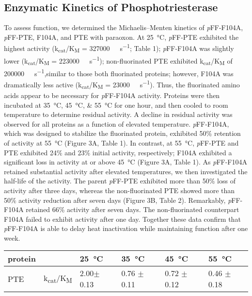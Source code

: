 \begin{refsection}
\subsection{Enzymatic Kinetics of Phosphotriesterase}

To assess function, we determined the Michaelis–Menten kinetics of
\emph{p}FF-F104A, \emph{p}FF-PTE, F104A, and PTE with paraoxon. At
\SI{25}{\celsius}, \emph{p}FF-PTE exhibited the highest activity
(k\textsubscript{cat}/K\textsubscript{M} = \SI{327000}{\per\Molar\per\second};
Table 1); \emph{p}FF-F104A was slightly lower
(k\textsubscript{cat}/K\textsubscript{M} = \SI{223000}{\per\Molar\per\second});
non-fluorinated PTE exhibited k\textsubscript{cat}/K\textsubscript{M} of
\SI{200000}{\per\Molar\per\second},similar to those both fluorinated proteins;
however, F104A was dramatically less active
(k\textsubscript{cat}/K\textsubscript{M} = \SI{23000}{\per\Molar\per\second}).
Thus, the fluorinated amino acids appear to be necessary for \emph{p}FF-F104A
activity.  Proteins were then incubated at \SIlist{35;45;55}{\celsius} for one
hour, and then cooled to room temperature to determine residual activity. A
decline in residual activity was observed for all proteins as a function of
elevated temperature. \emph{p}FF-F104A, which was designed to stabilize the
fluorinated protein, exhibited 50\% retention of activity at \SI{55}{\celsius}
(Figure 3A, Table 1). In contrast, at \SI{55}{\celsius}, \emph{p}FF-PTE and PTE
exhibited 24\% and 23\% initial activity, respectively; F104A exhibited a
significant loss in activity at or above \SI{45}{\celsius} (Figure 3A, Table
1). As \emph{p}FF-F104A retained substantial activity after elevated
temperatures, we then investigated the half-life of the activity. The parent
\emph{p}FF-PTE exhibited more than 50\% loss of activity after three days,
whereas the non-fluorinated PTE showed more than 50\% activity reduction after
seven days (Figure 3B, Table 2). Remarkably, \emph{p}FF-F104A retained 66\%
activity after seven days. The non-fluorinated counterpart F104A failed to
exhibit activity after one day. Together these data confirm that
\emph{p}FF-F104A is able to delay heat inactivation while maintaining function
after one week.
\begin{table}[h!]
\centering
    \begin{tabular}{llllll}
    \hline
    protein                 &  & \SI{25}{\celsius} & \SI{35}{\celsius} &
    \SI{45}{\celsius} & \SI{55}{\celsius} \\ 
    \hline
    \multirow{2}{*}{PTE}    & k\textsubscript{cat}/K\textsubscript{M} & 2.00$
    \pm$ 0.13 & 0.76 $\pm$ 0.11 & 0.72 $\pm$ 0.12 & 0.46 $\pm$ 0.18 \\
    

\end{tabular}
\end{table}
\end{refsection}
